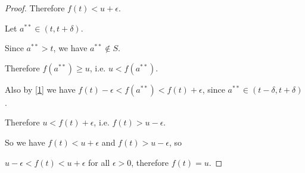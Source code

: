 \documentclass[12pt]{article}
\begin{document}
\begin{proof}
  Therefore $f(t) < u + \epsilon$.

  Let $a^{**} \in (t, t + \delta)$.

  Since $a^{**} > t$, we have $a^{**} \notin S$.

  Therefore $f(a^{**}) \geq u$, i.e. $u < f(a^{**})$.

  Also by \eqref{1} we have $f(t) - \epsilon < f(a^{**}) < f(t) + \epsilon$, since
  $a^{**} \in (t - \delta, t + \delta)$.

  Therefore $u < f(t) + \epsilon$, i.e. $f(t) > u - \epsilon$.

  So we have $f(t) < u + \epsilon$ and $f(t) > u - \epsilon$, so

  $u - \epsilon < f(t) < u + \epsilon$ for all $\epsilon > 0$, therefore $f(t) = u$.
\end{proof}





















\end{document}
